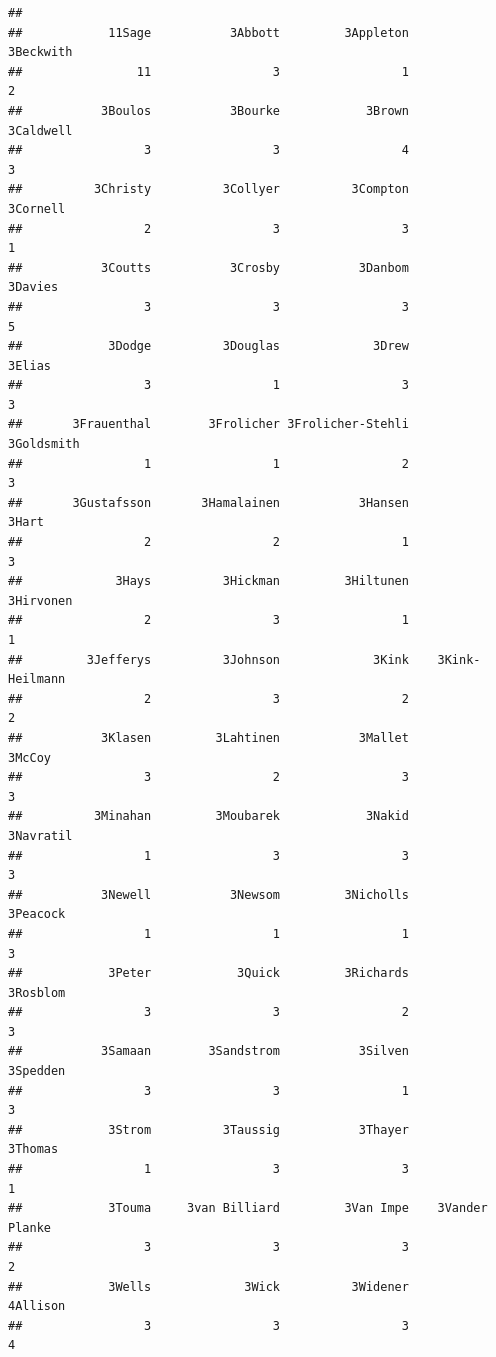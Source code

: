 \documentclass[ignorenonframetext,]{beamer}
\begin{document}
\begin{frame}[fragile]{}
\begin{verbatim}
## 
##            11Sage           3Abbott         3Appleton         3Beckwith 
##                11                 3                 1                 2 
##           3Boulos           3Bourke            3Brown         3Caldwell 
##                 3                 3                 4                 3 
##          3Christy          3Collyer          3Compton          3Cornell 
##                 2                 3                 3                 1 
##           3Coutts           3Crosby           3Danbom           3Davies 
##                 3                 3                 3                 5 
##            3Dodge          3Douglas             3Drew            3Elias 
##                 3                 1                 3                 3 
##       3Frauenthal        3Frolicher 3Frolicher-Stehli        3Goldsmith 
##                 1                 1                 2                 3 
##       3Gustafsson       3Hamalainen           3Hansen             3Hart 
##                 2                 2                 1                 3 
##             3Hays          3Hickman         3Hiltunen         3Hirvonen 
##                 2                 3                 1                 1 
##         3Jefferys          3Johnson             3Kink    3Kink-Heilmann 
##                 2                 3                 2                 2 
##           3Klasen         3Lahtinen           3Mallet            3McCoy 
##                 3                 2                 3                 3 
##          3Minahan         3Moubarek            3Nakid         3Navratil 
##                 1                 3                 3                 3 
##           3Newell           3Newsom         3Nicholls          3Peacock 
##                 1                 1                 1                 3 
##            3Peter            3Quick         3Richards          3Rosblom 
##                 3                 3                 2                 3 
##           3Samaan        3Sandstrom           3Silven          3Spedden 
##                 3                 3                 1                 3 
##            3Strom          3Taussig           3Thayer           3Thomas 
##                 1                 3                 3                 1 
##            3Touma     3van Billiard         3Van Impe    3Vander Planke 
##                 3                 3                 3                 2 
##            3Wells             3Wick          3Widener          4Allison 
##                 3                 3                 3                 4 

\end{verbatim}
\end{frame}
\end{document}
